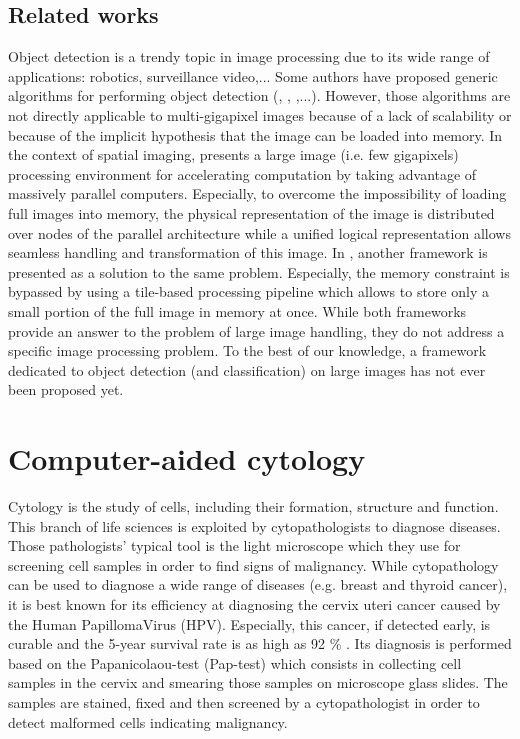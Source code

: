 \subsection{Related works}
Object detection is a trendy topic in image processing due to its wide range of applications: robotics, surveillance video,...  Some authors have proposed generic algorithms for performing object detection (\cite{lecun2004learning}, \cite{opelt2006generic}, \cite{wang2013regionlets},...). However, those algorithms are not directly applicable to multi-gigapixel images because of a lack of scalability or because of the implicit hypothesis that the image can be loaded into memory. In the context of spatial imaging, \cite{jones2003gigapixel} presents a large image (i.e. few gigapixels) processing environment for accelerating computation by taking advantage of massively parallel computers. Especially, to overcome the impossibility of loading full images into memory, the physical representation of the image is distributed over nodes of the parallel architecture while a unified logical representation allows seamless handling and transformation of this image. In \cite{powell2010scalable}, another framework is presented as a solution to the same problem. Especially, the memory constraint is bypassed by using a tile-based processing pipeline which allows to store only a small portion of the full image in memory at once. While both frameworks provide an answer to the problem of large image handling, they do not address a specific image processing problem. To the best of our knowledge, a framework dedicated to object detection (and classification) on large images has not ever been proposed yet.

\section{Computer-aided cytology}
\label{sec:cadc}
Cytology is the study of cells, including their formation, structure and function. This branch of life sciences is exploited by cytopathologists to diagnose diseases. Those pathologists' typical tool is the light microscope which they use for screening cell samples in order to find signs of malignancy. While cytopathology can be used to diagnose a wide range of diseases (e.g. breast and thyroid cancer), it is best known for its efficiency at diagnosing the cervix uteri cancer caused by the Human PapillomaVirus (HPV). Especially, this cancer, if detected early, is curable and the 5-year survival rate is as high as 92 \% \cite{bengtsson2014screening}. Its diagnosis is performed based on the Papanicolaou-test (Pap-test) which consists in collecting cell samples in the cervix and smearing those samples on microscope glass slides. The samples are stained, fixed and then screened by a cytopathologist in order to detect malformed cells indicating malignancy. 

